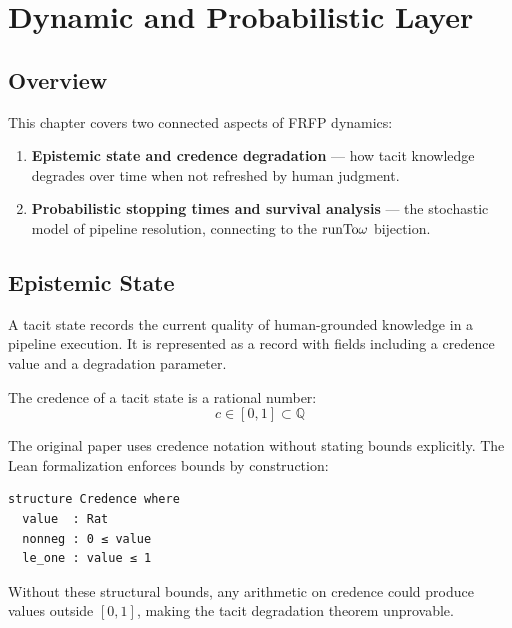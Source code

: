 \section{Dynamic and Probabilistic Layer}
\label{ch:dynamic}

\subsection{Overview}

This chapter covers two connected aspects of FRFP dynamics:

\begin{enumerate}
  \item \textbf{Epistemic state and credence degradation} --- how tacit knowledge
        degrades over time when not refreshed by human judgment.
  \item \textbf{Probabilistic stopping times and survival analysis} --- the
        stochastic model of pipeline resolution, connecting to the $\mathrm{runTo}\omega$
        bijection.
\end{enumerate}

\subsection{Epistemic State}

\begin{definition}
A tacit state records the current quality of human-grounded knowledge in a
pipeline execution. It is represented as a record with fields including a credence
value and a degradation parameter.
\end{definition}

\begin{definition}[Credence]
The credence of a tacit state is a rational number:
\[
  c \in [0, 1] \subset \mathbb{Q}
\]
\end{definition}

\begin{correction}
The original paper uses credence notation without stating bounds explicitly.
The Lean formalization enforces bounds by construction:

\begin{lstlisting}
structure Credence where
  value  : Rat
  nonneg : 0 ≤ value
  le_one : value ≤ 1
\end{lstlisting}


Without these structural bounds, any arithmetic on credence could produce values
outside $[0,1]$, making the tacit degradation theorem unprovable.
\end{correction}

